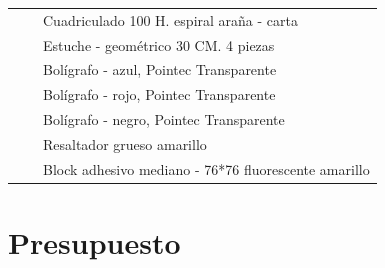\documentclass{article}
\begin{document}
\begin{table}[htbp]
{\begin{tabular}{|c|c|l|}
\cmidrule{3-3}          &       & Cuadriculado 100 H. espiral araña - carta \\
\cmidrule{3-3}          &       & Estuche - geométrico 30 CM. 4 piezas \\
\cmidrule{3-3}          &       & Bolígrafo - azul, Pointec Transparente \\
\cmidrule{3-3}          &       & Bolígrafo - rojo, Pointec Transparente \\
\cmidrule{3-3}          &       & Bolígrafo - negro, Pointec Transparente \\
\cmidrule{3-3}          &       & Resaltador grueso amarillo \\
\cmidrule{3-3}          &       & Block adhesivo mediano - 76*76 fluorescente amarillo \\
    \bottomrule
    \end{tabular}}%
  \label{tab:addlabel}%
\end{table}%

\newpage

\section{Presupuesto}
\end{document}
